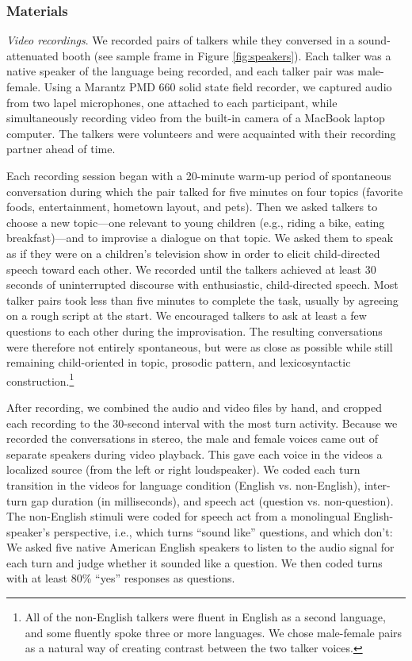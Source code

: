 \documentclass[authoryear, 12pt]{elsarticle}
\begin{document}
\subsubsection{Materials}

\textit{Video recordings}. We recorded pairs of talkers while they conversed in a sound-attenuated booth (see sample frame in Figure \ref{fig:speakers}). Each talker was a native speaker of the language being recorded, and each talker pair was male-female. Using a Marantz PMD 660 solid state field recorder, we captured audio from two lapel microphones, one attached to each participant, while simultaneously recording video from the built-in camera of a MacBook laptop computer. The talkers were volunteers and were acquainted with their recording partner ahead of time. 

Each recording session began with a 20-minute warm-up period of spontaneous conversation during which the pair talked for five minutes on four topics (favorite foods, entertainment, hometown layout, and pets). Then we asked talkers to choose a new topic---one relevant to young children (e.g., riding a bike, eating breakfast)---and to improvise a dialogue on that topic. We asked them to speak as if they were on a children's television show in order to elicit child-directed speech toward each other. We recorded until the talkers achieved at least 30 seconds of uninterrupted discourse with enthusiastic, child-directed speech. Most talker pairs took less than five minutes to complete the task, usually by agreeing on a rough script at the start. We encouraged talkers to ask at least a few questions to each other during the improvisation. The resulting conversations were therefore not entirely spontaneous, but were as close as possible while still remaining child-oriented in topic, prosodic pattern, and lexicosyntactic construction.\footnote{All of the non-English talkers were fluent in English as a second language, and some fluently spoke three or more languages. We chose male-female pairs as a natural way of creating contrast between the two talker voices.}

After recording, we combined the audio and video files by hand, and cropped each recording to the 30-second interval with the most turn activity. Because we recorded the conversations in stereo, the male and female voices came out of separate speakers during video playback. This gave each voice in the videos a localized source (from the left or right loudspeaker). We coded each turn transition in the videos for language condition (English vs. non-English), inter-turn gap duration (in milliseconds), and speech act (question vs. non-question). The non-English stimuli were coded for speech act from a monolingual English-speaker's perspective, i.e., which turns ``sound like'' questions, and which don't: We asked five native American English speakers to listen to the audio signal for each turn and judge whether it sounded like a question. We then coded turns with at least 80\% ``yes'' responses as questions.
\end{document}
